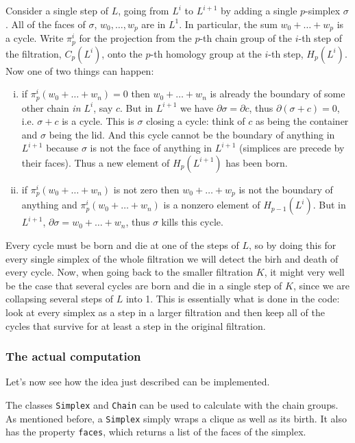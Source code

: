 \documentclass[../main.tex]{subfiles}
\begin{document}
Consider a single step of \( L \), going from \( L^i \) to \( L^{i+1} \) by adding a
single \( p \)-simplex \( \sigma \). All of the faces of \( \sigma \), \( w_0, \dots, w_p
\) are in \( L^1 \). In particular, the sum \( w_0 + \dots + w_p \) is a cycle. Write \( \pi_p^i \) for the projection from the \( p \)-th chain
group of the \( i \)-th step of the filtration, \( C_p(L^i) \), onto the \( p \)-th
homology group at the \( i \)-th step, \( H_p(L^i) \). Now one of
two things can happen:
\begin{enumerate}[(i)]
	\item if \( \pi_p^i(w_0 + \dots + w_n) = 0 \) then \( w_0 + \dots + w_n \) is already
		the boundary of some other chain \emph{in \( L^i \)}, say \( c \). But in \( L^{i+1}
		\) we have \( \partial \sigma = \partial c \), thus \( \partial(\sigma + c) = 0 \),
		i.e. \( \sigma + c \) is a cycle. This is \( \sigma \) closing a cycle: think of \( c
		\) as being the container and \( \sigma \) being the lid. And this cycle cannot be the
		boundary of anything in \( L^{i+1} \) because \( \sigma \) is not the face of anything
		in \( L^{i+1} \) (simplices are precede by their faces). Thus a new element of \(
		H_p(L^{i+1}) \) has been born. 
	\item if \( \pi_p^i(w_0 + \dots + w_n) \) is not zero then \( w_0 + \dots + w_p \) is
		not the boundary of anything and \( \pi_p^i(w_0 + \dots + w_n) \) is a nonzero element
		of \( H_{p-1}(L^i) \). But in \( L^{i+1} \), \( \partial \sigma = w_0 + \dots + w_n
		\), thus \( \sigma \) kills this cycle. 
\end{enumerate}
Every cycle must be born and die at one of the steps of \( L \), so by doing this for
every single simplex of the whole filtration we will detect the birh and death of every
cycle. Now, when going back to the smaller filtration \( K \), it might very well be the
case that several cycles are born and die in a single step of \( K \), since we are
collapsing several steps of \( L \) into 1. This is essentially what is done in the code:
look at every simplex as a step in a larger filtration and then keep all of the cycles
that survive for at least a step in the original filtration. 

\subsubsection{The actual computation}
Let's now see how the idea just described can be implemented. 

The classes \texttt{Simplex} and \texttt{Chain} can be used to calculate with the chain
groups. As mentioned before, a \texttt{Simplex} simply wraps a clique as well as its
birth. It also has the property \texttt{faces}, which returns a list of the faces of the
simplex.
\end{document}
